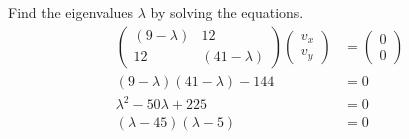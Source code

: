 \documentclass{article}
\begin{document}
Find the eigenvalues $\lambda$ by solving the equations.
\begin{align*}
    \begin{pmatrix}
        (9-\lambda) & 12 \\12 &(41-\lambda)
    \end{pmatrix}\begin{pmatrix}
        v_x \\v_y
    \end{pmatrix} & =  \begin{pmatrix}
        0 \\0
    \end{pmatrix}    \\
    (9-\lambda)(41-\lambda)-144                          & =                           0    \\
    \lambda^2 -50\lambda+225                             & =                              0 \\
    (\lambda-45)(\lambda-5)                              & =0
\end{align*}
\end{document}

